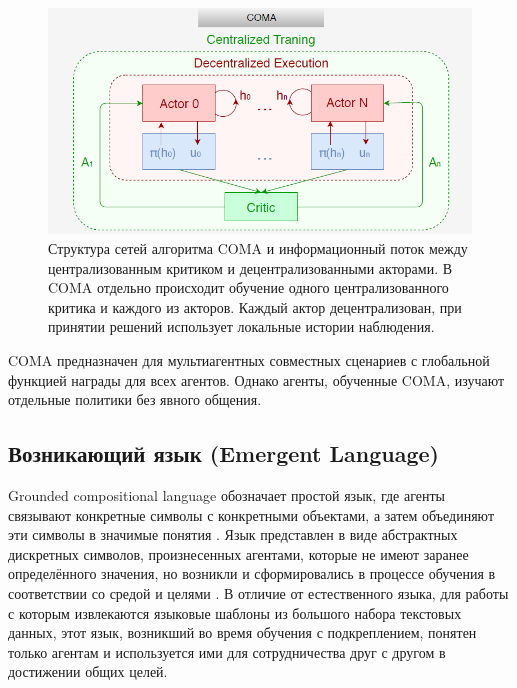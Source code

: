 \begin{figure}[ht!]
    \center
    \includegraphics [scale=0.80] {my_folder/images/ch2/coma.png}
    \caption{Структура сетей алгоритма COMA и информационный поток между централизованным критиком и децентрализованными акторами. В COMA отдельно происходит обучение одного централизованного критика и каждого из акторов. Каждый актор децентрализован, при принятии решений использует локальные истории наблюдения. \cite{foerster2017counterfactual}}
    \label{fig:ch2-coma}
\end{figure} %

COMA предназначен для мультиагентных совместных сценариев с глобальной функцией награды для всех агентов. Однако агенты, обученные COMA, изучают отдельные политики без явного общения. \cite{foerster2017counterfactual}

\subsection{Возникающий язык (Emergent Language)}

Grounded compositional language обозначает простой язык, где агенты связывают конкретные символы с конкретными объектами, а затем объединяют эти символы в значимые понятия \cite{Szabo2008-SZAC}. Язык представлен в виде абстрактных дискретных символов, произнесенных агентами, которые не имеют заранее определённого значения, но возникли и сформировались в процессе обучения в соответствии со средой и целями \cite{mordatch2017emergence}. В отличие от естественного языка, для работы с которым извлекаются языковые шаблоны из большого набора текстовых данных, этот язык, возникший во время обучения с подкреплением, понятен только агентам и используется ими для сотрудничества друг с другом в достижении общих целей.
